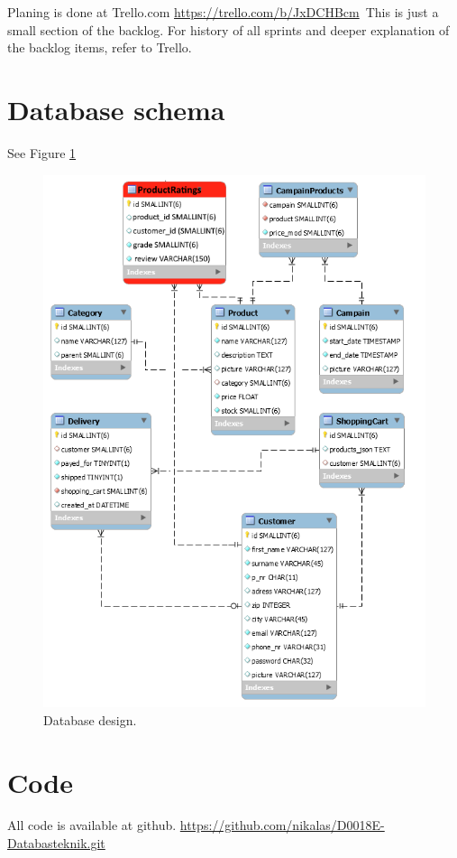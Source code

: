 \documentclass[paper=a4, fontsize=11pt]{report} %
\begin{document}
\begin{itemize}
	Planing is done at Trello.com
	\url{https://trello.com/b/JxDCHBcm}\
	This is just a small section of the backlog. For history of all sprints and deeper
	explanation of the backlog items, refer to Trello.

\section*{Database schema}
See Figure \ref{fig:6}
\begin{figure}
	\includegraphics[scale=0.7]{artifacts/db_implemented_1_3.png}
	\caption{Database design.}
	\label{fig:6}
\end{figure}

\section*{Code}
All code is available at github.
\url{https://github.com/nikalas/D0018E-Databasteknik.git}


\end{itemize}
\end{document}
